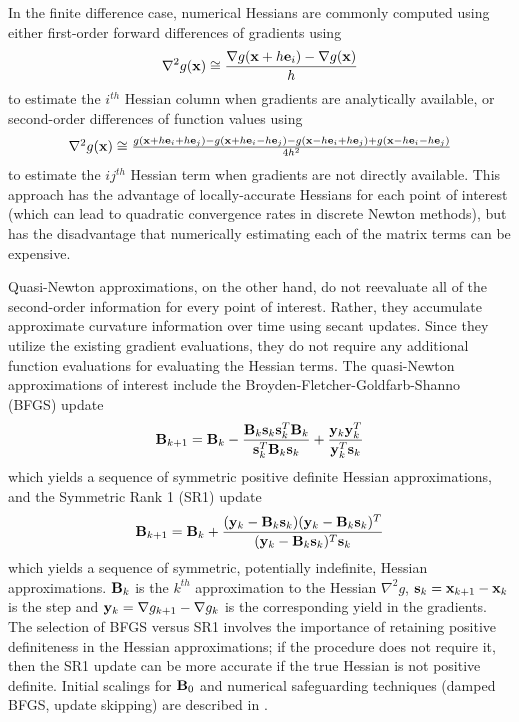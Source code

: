 In the finite difference case, numerical Hessians are commonly computed
using either first-order forward differences of gradients using
\begin{equation}
\nabla^2 g ({\bf x}) \cong 
\frac{\nabla g ({\bf x} + h {\bf e}_i) - \nabla g ({\bf x})}{h}
\end{equation}
to estimate the $i^{th}$ Hessian column when gradients are analytically 
available, or second-order differences of function values using
\begin{equation}
\begin{array}{l}
\nabla^2 g ({\bf x}) \cong \frac{g({\bf x} + h {\bf e}_i + h {\bf e}_j) - 
g({\bf x} + h {\bf e}_i - h {\bf e}_j) - 
g({\bf x} - h {\bf e}_i + h {\bf e}_j) + 
g({\bf x} - h {\bf e}_i - h {\bf e}_j)}{4h^2}
\end{array}
\end{equation}
to estimate the $ij^{th}$ Hessian term when gradients are not directly
available.  This approach has the advantage of locally-accurate
Hessians for each point of interest (which can lead to quadratic
convergence rates in discrete Newton methods), but has the
disadvantage that numerically estimating each of the matrix terms can
be expensive.

Quasi-Newton approximations, on the other hand, do not reevaluate all
of the second-order information for every point of interest.  Rather,
they accumulate approximate curvature information over time using
secant updates.  Since they utilize the existing gradient evaluations,
they do not require any additional function evaluations for evaluating
the Hessian terms.  The quasi-Newton approximations of interest
include the Broyden-Fletcher-Goldfarb-Shanno (BFGS) update
\begin{equation}
{\bf B}_{k+1} = {\bf B}_{k} - \frac{{\bf B}_k {\bf s}_k {\bf s}_k^T {\bf B}_k}
{{\bf s}_k^T {\bf B}_k {\bf s}_k} + 
\frac{{\bf y}_k {\bf y}_k^T}{{\bf y}_k^T {\bf s}_k} \label{eq:bfgs}
\end{equation}
which yields a sequence of symmetric positive definite Hessian
approximations, and the Symmetric Rank 1 (SR1) update
\begin{equation}
{\bf B}_{k+1} = {\bf B}_{k} + 
\frac{({\bf y}_k - {\bf B}_k {\bf s}_k)({\bf y}_k - {\bf B}_k {\bf s}_k)^T}
{({\bf y}_k - {\bf B}_k {\bf s}_k)^T {\bf s}_k} \label{eq:sr1}
\end{equation}
which yields a sequence of symmetric, potentially indefinite, Hessian 
approximations.  ${\bf B}_k$ is the $k^{th}$ approximation to
the Hessian $\nabla^2 g$, ${\bf s}_k = {\bf x}_{k+1} - {\bf x}_k$ is
the step and ${\bf y}_k = \nabla g_{k+1} - \nabla g_k$ is the
corresponding yield in the gradients.  The selection of BFGS versus SR1
involves the importance of retaining positive definiteness in the
Hessian approximations; if the procedure does not require it, then
the SR1 update can be more accurate if the true Hessian is not positive 
definite.  Initial scalings for ${\bf B}_0$ and numerical safeguarding 
techniques (damped BFGS, update skipping) are described in \cite{Eld06a}.


